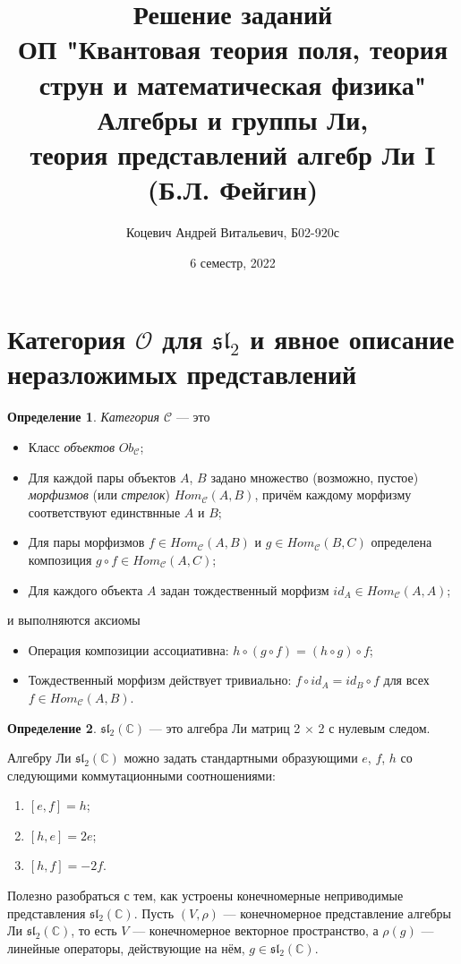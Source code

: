 \documentclass[12pt]{article}
\title{Решение заданий\\ ОП "Квантовая теория поля, теория струн и математическая физика"\\[2cm]
Алгебры и группы Ли,\\ теория представлений алгебр Ли I\\ (Б.Л. Фейгин)}
\author{Коцевич Андрей Витальевич, Б02-920с}
\date{6 семестр, 2022}
\theoremstyle{definition}
\newtheorem{defin}{Определение}[]
\begin{document}
\setlength{\parindent}{0pt}
\section{Категория $\mathcal{O}$ для $\mathfrak{sl_2}$ и явное описание неразложимых представлений}
\begin{defin}
\textit{Категория $\mathcal{C}$} --- это
\begin{itemize}
    \item Класс \textit{объектов} $Ob_{\mathcal{C}}$;
    \item Для каждой пары объектов $A$, $B$ задано множество (возможно, пустое) \textit{морфизмов} (или \textit{стрелок}) $Hom_{\mathcal{C}}(A, B)$, причём каждому морфизму соответствуют единствнные $A$ и $B$;
    \item Для пары морфизмов $f \in Hom_{\mathcal{C}}(A, B)$ и $g \in Hom_{\mathcal{C}}(B, C)$ определена композиция $g \circ f \in Hom_{\mathcal{C}}(A, C)$;
    \item Для каждого объекта $A$ задан тождественный морфизм $id_A \in Hom_{\mathcal{C}}(A, A)$;
\end{itemize}
и выполняются аксиомы
\begin{itemize}
    \item Операция композиции ассоциативна: $h \circ (g \circ f) = (h \circ g) \circ f$;
    \item Тождественный морфизм действует тривиально: $f \circ id_A = id_B \circ f$ для всех $f \in Hom_{\mathcal{C}}(A, B)$.
\end{itemize}
\end{defin}

\begin{defin}
$\mathfrak{sl_2}(\mathbb{C})$ --- это алгебра Ли матриц 2 × 2 с нулевым следом.
\end{defin}

Алгебру Ли $\mathfrak{sl_2}(\mathbb{C})$ можно задать стандартными образующими $e$, $f$, $h$ со следующими коммутационными соотношениями:
\begin{enumerate}
    \item $[e, f] = h$;
    \item $[h, e] = 2e$;
    \item $[h, f] = -2f$.
\end{enumerate}

Полезно разобраться с тем, как устроены конечномерные неприводимые представления $\mathfrak{sl_2}(\mathbb{C})$. Пусть $(V, \rho)$ --- конечномерное представление алгебры Ли $\mathfrak{sl_2}(\mathbb{C})$, то есть $V$ --- конечномерное векторное пространство, а $\rho(g)$ --- линейные операторы, действующие на нём, $g \in \mathfrak{sl_2}(\mathbb{C})$.
\end{document}
